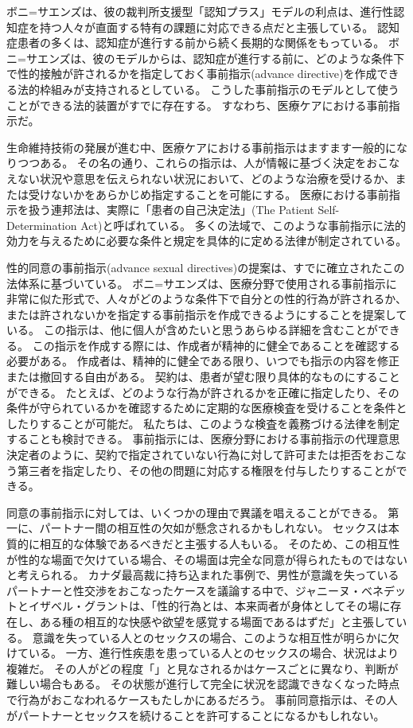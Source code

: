 \documentclass[paper=a4,book,openany]{jlreq} \usepackage{mystyle}
\begin{document}
ボニ=サエンズは、彼の裁判所支援型「認知プラス」モデルの利点は、進行性認知症を持つ人々が直面する特有の課題に対応できる点だと主張している。
認知症患者の多くは、認知症が進行する前から続く長期的な関係をもっている。
ボニ=サエンズは、彼のモデルからは、認知症が進行する前に、どのような条件下で性的接触が許されるかを指定しておく事前指示(advance directive)を作成できる法的枠組みが支持されるとしている。
こうした事前指示のモデルとして使うことができる法的装置がすでに存在する。
すなわち、医療ケアにおける事前指示だ。

生命維持技術の発展が進む中、医療ケアにおける事前指示はますます一般的になりつつある。
その名の通り、これらの指示は、人が情報に基づく決定をおこなえない状況や意思を伝えられない状況において、どのような治療を受けるか、または受けないかをあらかじめ指定することを可能にする。
医療における事前指示を扱う連邦法は、実際に「患者の自己決定法」(The Patient Self-Determination Act)と呼ばれている。
多くの法域で、このような事前指示に法的効力を与えるために必要な条件と規定を具体的に定める法律が制定されている\citep[cf.][]{srebnik99:_advan_direc_mental_healt_treat}。

性的同意の事前指示(advance sexual directives)の提案は、すでに確立されたこの法体系に基づいている。
ボニ=サエンズは、医療分野で使用される事前指示に非常に似た形式で、人々がどのような条件下で自分との性的行為が許されるか、または許されないかを指定する事前指示を作成できるようにすることを提案している\citep{boni-saenz15:_sexual_incap}。
この指示は、他に個人が含めたいと思うあらゆる詳細を含むことができる。
この指示を作成する際には、作成者が精神的に健全であることを確認する必要がある。
作成者は、精神的に健全である限り、いつでも指示の内容を修正または撤回する自由がある。
契約は、患者が望む限り具体的なものにすることができる。
たとえば、どのような行為が許されるかを正確に指定したり、その条件が守られているかを確認するために定期的な医療検査を受けることを条件としたりすることが可能だ。
私たちは、このような検査を義務づける法律を制定することも検討できる。
事前指示には、医療分野における事前指示の代理意思決定者のように、契約で指定されていない行為に対して許可または拒否をおこなう第三者を指定したり、その他の問題に対応する権限を付与したりすることができる。

同意の事前指示に対しては、いくつかの理由で異議を唱えることができる。
第一に、パートナー間の相互性の欠如が懸念されるかもしれない。
セックスは本質的に相互的な体験であるべきだと主張する人もいる。
そのため、この相互性が性的な場面で欠けている場合、その場面は完全な同意が得られたものではないと考えられる。
カナダ最高裁に持ち込まれた事例で、男性が意識を失っているパートナーと性交渉をおこなったケースを議論する中で、ジャニーヌ・ベネデットとイザベル・グラントは、「性的行為とは、本来両者が身体としてその場に存在し、ある種の相互的な快感や欲望を感覚する場面であるはずだ」と主張している\citep[p.80]{benedet10:confusing}。
意識を失っている人とのセックスの場合、このような相互性が明らかに欠けている。
一方、進行性疾患を患っている人とのセックスの場合、状況はより複雑だ。
その人がどの程度「」と見なされるかはケースごとに異なり、判断が難しい場合もある。
その状態が進行して完全に状況を認識できなくなった時点で行為がおこなわれるケースもたしかにあるだろう。
事前同意指示は、その人がパートナーとセックスを続けることを許可することになるかもしれない。
\end{document}
